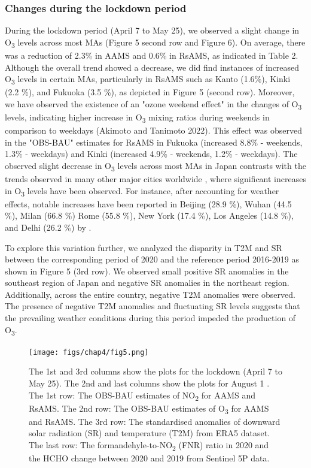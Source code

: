 \subsubsection*{Changes during the lockdown period}
During the lockdown period (April 7 to May 25), we observed a slight change in O\textsubscript{3} levels across most MAs (Figure 5 second row and Figure 6). On average, there was a reduction of 2.3\% in AAMS and 0.6\% in RsAMS, as indicated in Table 2. Although the overall trend showed a decrease, we did find instances of increased O\textsubscript{3} levels in certain MAs, particularly in RsAMS such as Kanto (1.6\%), Kinki (2.2 \%), and Fukuoka (3.5 \%), as depicted in Figure 5 (second row). Moreover, we have observed the existence of an "ozone weekend effect" in the changes of O\textsubscript{3} levels, indicating higher increase in O\textsubscript{3} mixing ratios during weekends in comparison to weekdays (Akimoto and Tanimoto 2022). This effect was observed in the "OBS-BAU" estimates for RsAMS in Fukuoka (increased 8.8\% - weekends, 1.3\% - weekdays) and Kinki (increased 4.9\% - weekends, 1.2\% - weekdays).
The observed slight decrease in O\textsubscript{3} levels across most MAs in Japan contrasts with the trends observed in many other major cities worldwide \citep{shi2021abrupt,grange2021covid}, where significant increases in O\textsubscript{3} levels have been observed. For instance, after accounting for weather effects, notable increases have been reported in Beijing (28.9 \%), Wuhan (44.5 \%), Milan (66.8 \%) Rome (55.8 \%), New York (17.4 \%), Los Angeles (14.8 \%), and Delhi (26.2 \%) by \citep{shi2021abrupt}.\par
To explore this variation further, we analyzed the disparity in T2M and SR between the corresponding period of 2020 and the reference period 2016-2019 as shown in Figure 5 (3rd row). We observed small positive SR anomalies in the southeast region of Japan and negative SR anomalies in the northeast region. Additionally, across the entire country, negative T2M anomalies were observed. The presence of negative T2M anomalies and fluctuating SR levels suggests that the prevailing weather conditions during this period impeded the production of O\textsubscript{3}. \par

\begin{figure}[p]
    \centering
    \texttt{[image: figs/chap4/fig5.png]}
    \caption[NO\textsubscript{2}, O\textsubscript{3}, SR, T2M, FNR, and HCHO variations in 2020]{The 1st and 3rd columns show the plots for the lockdown (April 7 to May 25). The 2nd and last columns show the plots for August 1 . The 1st row: The OBS-BAU estimates of NO\textsubscript{2} for AAMS and RsAMS. The 2nd row: The OBS-BAU estimates of O\textsubscript{3} for AAMS and RsAMS. The 3rd row: The standardised anomalies of downward solar radiation (SR) and temperature (T2M) from ERA5 dataset. The last row: The formandehyle-to-NO\textsubscript{2} (FNR) ratio in 2020 and the HCHO change between 2020 and 2019 from Sentinel 5P data.}
    \label{fig:chap4_fig5}
\end{figure}

